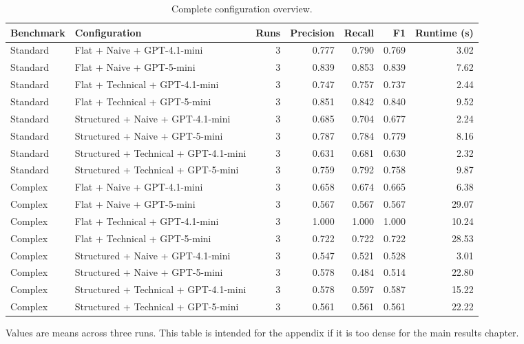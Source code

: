 \begin{table}[htbp]
\centering
\small
\caption{Complete configuration overview.}
\label{tab:overall-configuration-summary}
\begin{tabular}{llrrrrr}
\toprule
Benchmark & Configuration & Runs & Precision & Recall & F1 & Runtime (s) \\
\midrule
Standard & Flat + Naive + GPT-4.1-mini & 3 & 0.777 & 0.790 & 0.769 & 3.02 \\
Standard & Flat + Naive + GPT-5-mini & 3 & 0.839 & 0.853 & 0.839 & 7.62 \\
Standard & Flat + Technical + GPT-4.1-mini & 3 & 0.747 & 0.757 & 0.737 & 2.44 \\
Standard & Flat + Technical + GPT-5-mini & 3 & 0.851 & 0.842 & 0.840 & 9.52 \\
Standard & Structured + Naive + GPT-4.1-mini & 3 & 0.685 & 0.704 & 0.677 & 2.24 \\
Standard & Structured + Naive + GPT-5-mini & 3 & 0.787 & 0.784 & 0.779 & 8.16 \\
Standard & Structured + Technical + GPT-4.1-mini & 3 & 0.631 & 0.681 & 0.630 & 2.32 \\
Standard & Structured + Technical + GPT-5-mini & 3 & 0.759 & 0.792 & 0.758 & 9.87 \\
Complex & Flat + Naive + GPT-4.1-mini & 3 & 0.658 & 0.674 & 0.665 & 6.38 \\
Complex & Flat + Naive + GPT-5-mini & 3 & 0.567 & 0.567 & 0.567 & 29.07 \\
Complex & Flat + Technical + GPT-4.1-mini & 3 & 1.000 & 1.000 & 1.000 & 10.24 \\
Complex & Flat + Technical + GPT-5-mini & 3 & 0.722 & 0.722 & 0.722 & 28.53 \\
Complex & Structured + Naive + GPT-4.1-mini & 3 & 0.547 & 0.521 & 0.528 & 3.01 \\
Complex & Structured + Naive + GPT-5-mini & 3 & 0.578 & 0.484 & 0.514 & 22.80 \\
Complex & Structured + Technical + GPT-4.1-mini & 3 & 0.578 & 0.597 & 0.587 & 15.22 \\
Complex & Structured + Technical + GPT-5-mini & 3 & 0.561 & 0.561 & 0.561 & 22.22 \\
\bottomrule
\end{tabular}
\par\footnotesize{Values are means across three runs. This table is intended for the appendix if it is too dense for the main results chapter.}
\end{table}
